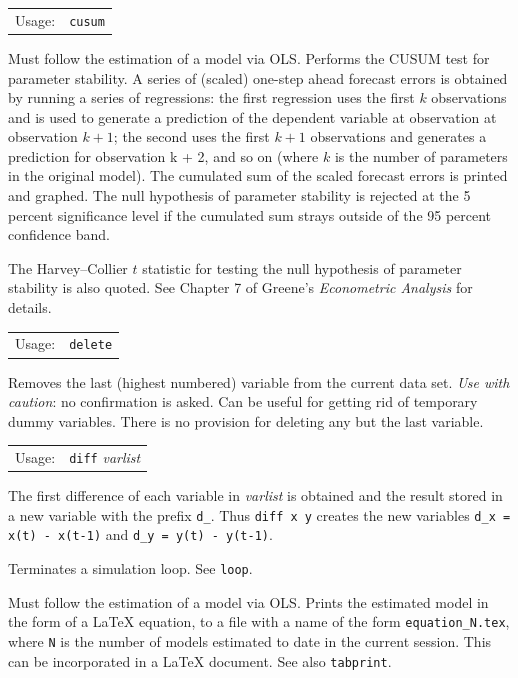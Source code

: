 \documentclass{article}
\begin{document}
{\begin{tabular}{ll}
Usage:  &        \texttt{cusum}
\end{tabular}

Must follow the estimation of a model via OLS.  Performs the CUSUM
test for parameter stability.  A series of (scaled) one-step ahead
forecast errors is obtained by running a series of regressions: the
first regression uses the first $k$ observations and is used to
generate a prediction of the dependent variable at observation at
observation $k + 1$; the second uses the first $k + 1$ observations
and generates a prediction for observation k + 2, and so on (where $k$
is the number of parameters in the original model).  The cumulated sum
of the scaled forecast errors is printed and graphed.  The null
hypothesis of parameter stability is rejected at the 5 percent
significance level if the cumulated sum strays outside of the 95
percent confidence band.

The Harvey--Collier $t$ statistic for testing the null hypothesis of
parameter stability is also quoted.  See Chapter 7 of Greene's
\textit{Econometric Analysis} for details.


\begin{tabular}{ll}
Usage:     &     \texttt{delete}
\end{tabular}

Removes the last (highest numbered) variable from the current data
set.  \textit{Use with caution}: no confirmation is asked.  Can be
useful for getting rid of temporary dummy variables.  There is no
provision for deleting any but the last variable.


\begin{tabular}{ll}
Usage:   &      \texttt{diff} \textit{varlist} 
\end{tabular}

The first difference of each variable in \textit{varlist} is
obtained and the result stored in a new variable with the prefix
\texttt{d\_}.  Thus \texttt{diff x y} creates the new variables
\texttt{d\_x = x(t) - x(t-1)} and \texttt{d\_y = y(t) - y(t-1)}.


Terminates a simulation loop.  See \texttt{loop}.


Must follow the estimation of a model via OLS.  Prints the estimated
model in the form of a \LaTeX{} equation, to a file with a name of the
form \texttt{equation\_N.tex}, where \texttt{N} is the number of
models estimated to date in the current session.  This can be
incorporated in a \LaTeX{} document.  See also \texttt{tabprint}.

}
\end{document}
